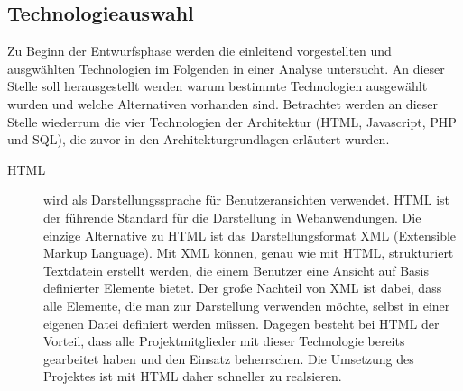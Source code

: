 \subsection{Technologieauswahl}
\label{sec:Technologieauswahl}

Zu Beginn der Entwurfsphase werden die einleitend vorgestellten und ausgwählten Technologien im Folgenden in einer Analyse untersucht. An dieser Stelle soll herausgestellt werden warum bestimmte Technologien ausgewählt wurden und welche Alternativen vorhanden sind. Betrachtet werden an dieser Stelle wiederrum die vier Technologien der Architektur (HTML, Javascript, PHP und SQL), die zuvor in den Architekturgrundlagen erläutert wurden.

\begin{description}
  \item[HTML] wird als Darstellungssprache für Benutzeransichten verwendet. HTML ist der führende Standard für die Darstellung in Webanwendungen. Die einzige Alternative zu HTML ist das Darstellungsformat XML (Extensible Markup Language). Mit XML können, genau wie mit HTML, strukturiert Textdatein erstellt werden, die einem Benutzer eine Ansicht auf Basis definierter Elemente bietet. Der große Nachteil von XML ist dabei, dass alle Elemente, die man zur Darstellung verwenden möchte, selbst in einer eigenen Datei definiert werden müssen. Dagegen besteht bei HTML der Vorteil, dass alle Projektmitglieder mit dieser Technologie bereits gearbeitet haben und den Einsatz beherrschen. Die Umsetzung des
  Projektes ist mit HTML daher schneller zu realsieren.


\end{description}
